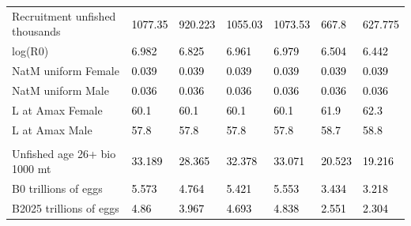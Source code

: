 \documentclass[
]{article}
\begin{document}
\begin{landscape}
\begin{longtable}[t]{ll>{\raggedright\arraybackslash}p{5em}>{\raggedright\arraybackslash}p{5em}>{\raggedright\arraybackslash}p{5em}>{\raggedright\arraybackslash}p{5em}>{\raggedright\arraybackslash}p{5em}}
\hspace{1em}Recruitment unfished thousands & \textcolor{black}{1077.35} & \textcolor{black}{920.223} & \textcolor{black}{1055.03} & \textcolor{black}{1073.53} & \textcolor{black}{667.8} & \textcolor{black}{627.775}\\
\hspace{1em}log(R0) & \textcolor{black}{6.982} & \textcolor{black}{6.825} & \textcolor{black}{6.961} & \textcolor{black}{6.979} & \textcolor{black}{6.504} & \textcolor{black}{6.442}\\
\hspace{1em}NatM uniform Female & \textcolor{black}{0.039} & \textcolor{black}{0.039} & \textcolor{black}{0.039} & \textcolor{black}{0.039} & \textcolor{black}{0.039} & \textcolor{black}{0.039}\\
\hspace{1em}NatM uniform Male & \textcolor{black}{0.036} & \textcolor{black}{0.036} & \textcolor{black}{0.036} & \textcolor{black}{0.036} & \textcolor{black}{0.036} & \textcolor{black}{0.036}\\
\hspace{1em}L at Amax Female & \textcolor{black}{60.1} & \textcolor{black}{60.1} & \textcolor{black}{60.1} & \textcolor{black}{60.1} & \textcolor{black}{61.9} & \textcolor{black}{62.3}\\
\hspace{1em}L at Amax Male & \textcolor{black}{57.8} & \textcolor{black}{57.8} & \textcolor{black}{57.8} & \textcolor{black}{57.8} & \textcolor{black}{58.7} & \textcolor{black}{58.8}\\
\addlinespace[0.3em]
\multicolumn{7}{l}{\textbf{Estimates of derived quantities}}\\
\hspace{1em}Unfished age 26+ bio 1000 mt & \textcolor{black}{33.189} & \textcolor{black}{28.365} & \textcolor{black}{32.378} & \textcolor{black}{33.071} & \textcolor{black}{20.523} & \textcolor{black}{19.216}\\
\hspace{1em}B0 trillions of eggs & \textcolor{black}{5.573} & \textcolor{black}{4.764} & \textcolor{black}{5.421} & \textcolor{black}{5.553} & \textcolor{black}{3.434} & \textcolor{black}{3.218}\\
\hspace{1em}B2025 trillions of eggs & \textcolor{black}{4.86} & \textcolor{black}{3.967} & \textcolor{black}{4.693} & \textcolor{black}{4.838} & \textcolor{black}{2.551} & \textcolor{black}{2.304}\\

\end{longtable}
\end{landscape}
\end{document}
